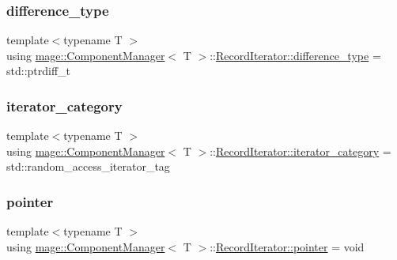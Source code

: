 \subsubsection{\texorpdfstring{difference\+\_\+type}{difference\_type}}
{\footnotesize\ttfamily template$<$typename T $>$ \\
using \mbox{\hyperlink{classmage_1_1_component_manager}{mage\+::\+Component\+Manager}}$<$ T $>$\+::\mbox{\hyperlink{classmage_1_1_component_manager_1_1_record_iterator_a3ca7b08fca57e3f69c5de58be46edd70}{Record\+Iterator\+::difference\+\_\+type}} =  std\+::ptrdiff\+\_\+t}

\mbox{\label{classmage_1_1_component_manager_1_1_record_iterator_a3fb25cab94eee72ee71ccb22c3b2ac7b}} 
\subsubsection{\texorpdfstring{iterator\+\_\+category}{iterator\_category}}
{\footnotesize\ttfamily template$<$typename T $>$ \\
using \mbox{\hyperlink{classmage_1_1_component_manager}{mage\+::\+Component\+Manager}}$<$ T $>$\+::\mbox{\hyperlink{classmage_1_1_component_manager_1_1_record_iterator_a3fb25cab94eee72ee71ccb22c3b2ac7b}{Record\+Iterator\+::iterator\+\_\+category}} =  std\+::random\+\_\+access\+\_\+iterator\+\_\+tag}

\mbox{\label{classmage_1_1_component_manager_1_1_record_iterator_a2d5e24d6c2530fafb1c3c7fdf6875ea8}} 
\subsubsection{\texorpdfstring{pointer}{pointer}}
{\footnotesize\ttfamily template$<$typename T $>$ \\
using \mbox{\hyperlink{classmage_1_1_component_manager}{mage\+::\+Component\+Manager}}$<$ T $>$\+::\mbox{\hyperlink{classmage_1_1_component_manager_1_1_record_iterator_a2d5e24d6c2530fafb1c3c7fdf6875ea8}{Record\+Iterator\+::pointer}} =  void}

